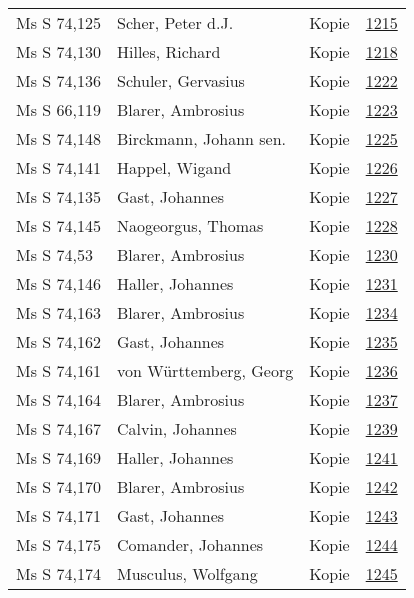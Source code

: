\documentclass[10pt,a4paper,landscape]{report}
\begin{document}
\begin{longtable}{p{16cm}p{4cm}lr}
Ms S 74,125	&	Scher, Peter d.J.	&	Kopie	&	\href{http://130.60.24.72/assignment/1215}{1215}\\
Ms S 74,130	&	Hilles, Richard	&	Kopie	&	\href{http://130.60.24.72/assignment/1218}{1218}\\
Ms S 74,136	&	Schuler, Gervasius	&	Kopie	&	\href{http://130.60.24.72/assignment/1222}{1222}\\
Ms S 66,119	&	Blarer, Ambrosius	&	Kopie	&	\href{http://130.60.24.72/assignment/1223}{1223}\\
Ms S 74,148	&	Birckmann, Johann sen.	&	Kopie	&	\href{http://130.60.24.72/assignment/1225}{1225}\\
Ms S 74,141	&	Happel, Wigand	&	Kopie	&	\href{http://130.60.24.72/assignment/1226}{1226}\\
Ms S 74,135	&	Gast, Johannes	&	Kopie	&	\href{http://130.60.24.72/assignment/1227}{1227}\\
Ms S 74,145	&	Naogeorgus, Thomas	&	Kopie	&	\href{http://130.60.24.72/assignment/1228}{1228}\\
Ms S 74,53	&	Blarer, Ambrosius	&	Kopie	&	\href{http://130.60.24.72/assignment/1230}{1230}\\
Ms S 74,146	&	Haller, Johannes	&	Kopie	&	\href{http://130.60.24.72/assignment/1231}{1231}\\
Ms S 74,163	&	Blarer, Ambrosius	&	Kopie	&	\href{http://130.60.24.72/assignment/1234}{1234}\\
Ms S 74,162	&	Gast, Johannes	&	Kopie	&	\href{http://130.60.24.72/assignment/1235}{1235}\\
Ms S 74,161	&	von Württemberg, Georg	&	Kopie	&	\href{http://130.60.24.72/assignment/1236}{1236}\\
Ms S 74,164	&	Blarer, Ambrosius	&	Kopie	&	\href{http://130.60.24.72/assignment/1237}{1237}\\
Ms S 74,167	&	Calvin, Johannes	&	Kopie	&	\href{http://130.60.24.72/assignment/1239}{1239}\\
Ms S 74,169	&	Haller, Johannes	&	Kopie	&	\href{http://130.60.24.72/assignment/1241}{1241}\\
Ms S 74,170	&	Blarer, Ambrosius	&	Kopie	&	\href{http://130.60.24.72/assignment/1242}{1242}\\
Ms S 74,171	&	Gast, Johannes	&	Kopie	&	\href{http://130.60.24.72/assignment/1243}{1243}\\
Ms S 74,175	&	Comander, Johannes	&	Kopie	&	\href{http://130.60.24.72/assignment/1244}{1244}\\
Ms S 74,174	&	Musculus, Wolfgang	&	Kopie	&	\href{http://130.60.24.72/assignment/1245}{1245}\\

\end{longtable}
\end{document}
